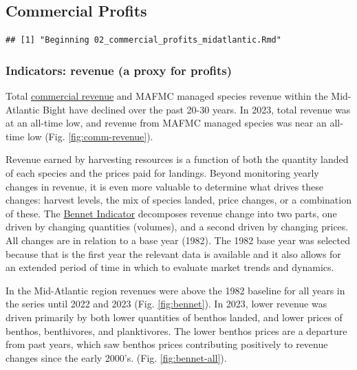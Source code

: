 \documentclass[
  10pt,
]{article}
\begin{document}
\subsection{Commercial Profits}\label{commercial-profits}

\begin{verbatim}
## [1] "Beginning 02_commercial_profits_midatlantic.Rmd"
\end{verbatim}

\subsubsection{Indicators: revenue (a proxy for profits)}\label{indicators-revenue-a-proxy-for-profits}

Total \href{https://noaa-edab.github.io/catalog/comdat.html}{commercial revenue} and MAFMC managed species revenue within the Mid-Atlantic Bight have declined over the past 20-30 years. In 2023, total revenue was at an all-time low, and revenue from MAFMC managed species was near an all-time low (Fig. \ref{fig:comm-revenue}).

Revenue earned by harvesting resources is a function of both the quantity landed of each species and the prices paid for landings. Beyond monitoring yearly changes in revenue, it is even more valuable to determine what drives these changes: harvest levels, the mix of species landed, price changes, or a combination of these. The \href{https://noaa-edab.github.io/catalog/bennet.html}{Bennet Indicator} decomposes revenue change into two parts, one driven by changing quantities (volumes), and a second driven by changing prices. All changes are in relation to a base year (1982). The 1982 base year was selected because that is the first year the relevant data is available and it also allows for an extended period of time in which to evaluate market trends and dynamics.

In the Mid-Atlantic region revenues were above the 1982 baseline for all years in the series until 2022 and 2023 (Fig. \ref{fig:bennet}). In 2023, lower revenue was driven primarily by both lower quantities of benthos landed, and lower prices of benthos, benthivores, and planktivores. The lower benthos prices are a departure from past years, which saw benthos prices contributing positively to revenue changes since the early 2000's. (Fig. \ref{fig:bennet-all}).
\end{document}
